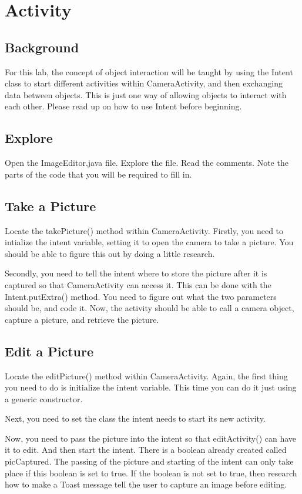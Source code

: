 \section{Activity}

\subsection{Background}
For this lab, the concept of object interaction will be taught by using the Intent class to start different activities within CameraActivity, and then exchanging data between objects. This is just one way of allowing objects to interact with each other. Please read up on how to use Intent before beginning.

\subsection{Explore}
Open the ImageEditor.java file. Explore the file. Read the comments. Note the parts of the code that you will be required to fill in.

\subsection{Take a Picture}
Locate the takePicture() method within CameraActivity. Firstly, you need to intialize the intent variable, setting it to open the camera to take a picture. You should be able to figure this out by doing a little research.

Secondly, you need to tell the intent where to store the picture after it is captured so that CameraActivity can access it. This can be done with the Intent.putExtra() method. You need to figure out what the two parameters should be, and code it. Now, the activity should be able to call a camera object, capture a picture, and retrieve the picture.

\subsection{Edit a Picture}
Locate the editPicture() method within CameraActivity. Again, the first thing you need to do is initialize the intent variable. This time you can do it just using a generic constructor.

Next, you need to set the class the intent needs to start its new activity. 

Now, you need to pass the picture into the intent so that editActivity() can have it to edit. And then start the intent. There is a boolean already created called picCaptured. The passing of the picture and starting of the intent can only take place if this boolean is set to true. If the boolean is not set to true, then research how to make a Toast message tell the user to capture an image before editing.

